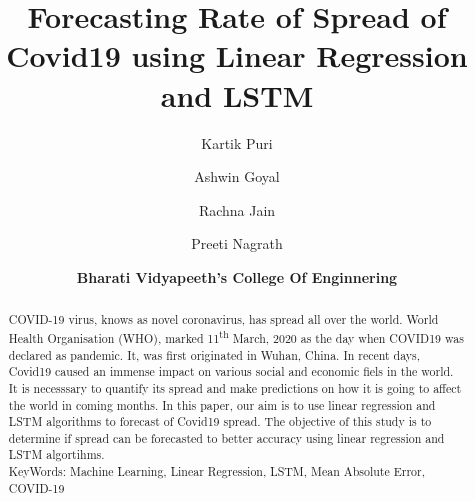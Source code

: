 \documentclass[9pt]{article}
\title{Forecasting Rate of Spread of Covid19 using Linear Regression and LSTM}
\author[1]{Kartik Puri}
\author[1]{Ashwin Goyal}
\author[2]{Rachna Jain}
\author[2]{Preeti Nagrath}
\affil[1]{Department of Electronics and Communication Engineering}
\affil[2]{Department of Computer Science and Engineering}
\date{\small{\textbf{Bharati
Vidyapeeth's College Of Enginnering} }}
\begin{document}
	\maketitle
	\begin{abstract}
		\begin{footnotesize}
		COVID-19 virus, knows as novel coronavirus, has spread all over
		the world.  World Health Organisation (WHO), marked
		11\textsuperscript{th} March, 2020 as the day when COVID19 was
		declared as pandemic. It, was first
		originated in Wuhan, China.
		In recent days, Covid19 caused an immense impact on various
		social and economic fiels in the world.
		It is necesssary to
		quantify its spread and make predictions on how it is going to
		affect the world in coming months.
		In this paper, our aim is to use linear
		regression and LSTM algorithms to forecast of Covid19 spread.
		The objective of this study is to determine if spread can be
		forecasted to better accuracy using linear regression and LSTM
		algortihms.
		 \\

		KeyWords: Machine Learning, Linear Regression, LSTM, Mean
		Absolute Error, COVID-19
		\\
		\end{footnotesize}
	\end{abstract}



\printbibliography
\end{document}
